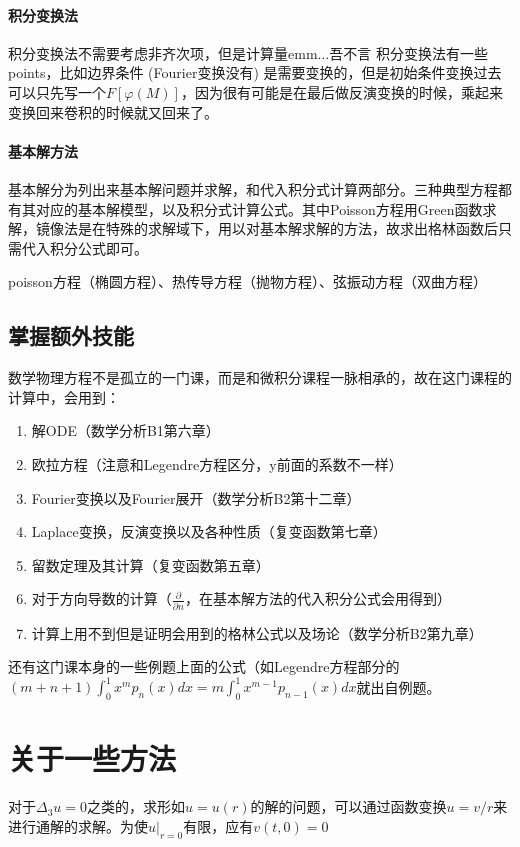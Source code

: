 \documentclass[]{report}
\begin{document}
		\paragraph{积分变换法}
		积分变换法不需要考虑非齐次项，但是计算量emm...吾不言\newline
		积分变换法有一些points，比如边界条件 (Fourier变换没有) 是需要变换的，但是初始条件变换过去可以只先写一个$F[\varphi(M)]$，因为很有可能是在最后做反演变换的时候，乘起来变换回来卷积的时候就又回来了。
		\paragraph{基本解方法}
		基本解分为列出来基本解问题并求解，和代入积分式计算两部分。三种典型方程都有其对应的基本解模型，以及积分式计算公式。其中Poisson方程用Green函数求解，镜像法是在特殊的求解域下，用以对基本解求解的方法，故求出格林函数后只需代入积分公式即可。\par
		poisson方程（椭圆方程）、热传导方程（抛物方程）、弦振动方程（双曲方程）
		\subsection{掌握额外技能}
		数学物理方程不是孤立的一门课，而是和微积分课程一脉相承的，故在这门课程的计算中，会用到：\par
		\begin{enumerate}
			\item 解ODE（数学分析B1第六章）
			\item 欧拉方程（注意和Legendre方程区分，y前面的系数不一样）
			\item Fourier变换以及Fourier展开（数学分析B2第十二章）
			\item Laplace变换，反演变换以及各种性质（复变函数第七章）
			\item 留数定理及其计算（复变函数第五章）
			\item 对于方向导数的计算（$\frac\partial{\partial n}$，在基本解方法的代入积分公式会用得到）
			\item 计算上用不到但是证明会用到的格林公式以及场论（数学分析B2第九章）
		\end{enumerate}\par
		还有这门课本身的一些例题上面的公式（如Legendre方程部分的$\displaystyle(m+n+1)\int_{0}^1x^mp_n(x)dx=m\int_0^1x^{m-1}p_{n-1}(x)dx$就出自例题。
	\section{关于一些方法}
		对于$\Delta_3u=0$之类的，求形如$u=u(r)$的解的问题，可以通过函数变换$u=v/r$来进行通解的求解。为使$u|_{r=0}$有限，应有$v(t,0)=0$
\end{document}
